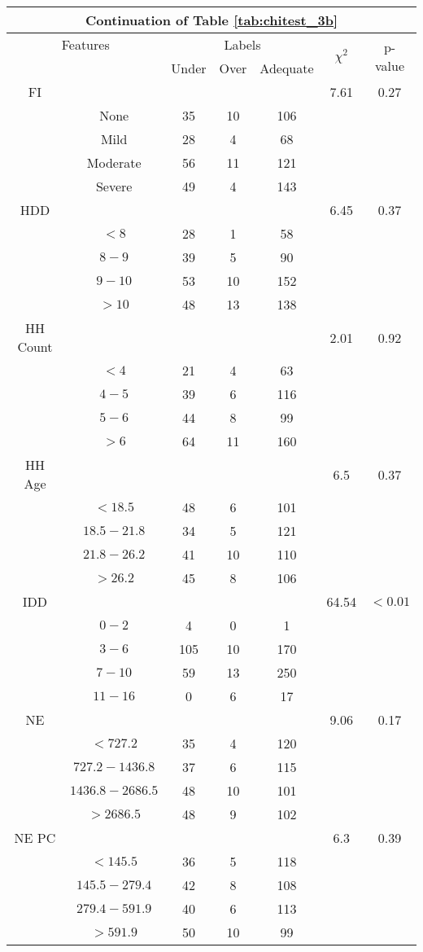 \begin{table}
\centering
\label{tab:chitest_3b_cont}
\begin{tabular}{c c | c c c| c | c}
\hline
\multicolumn{7}{c}{Continuation of Table \ref{tab:chitest_3b}}\\ 
\hline
\multicolumn{2}{c|}{Features}& \multicolumn{3}{c|}{Labels}& \multirow{2}{*}{$\chi^2$} & \multirow{2}{*}{p-value}\\ 
& & Under & Over & Adequate & & \\ 
\hline
FI &  &  &  & & 7.61 & 0.27 \\ 
& None & 35 & 10 & 106& & \\ 
& Mild & 28 & 4 & 68& & \\ 
& Moderate & 56 & 11 & 121& & \\ 
& Severe & 49 & 4 & 143& & \\ 
\hline 
HDD &  &  &  & & 6.45 & 0.37 \\ 
& $< 8$ & 28 & 1 & 58& & \\ 
& $8-9$ & 39 & 5 & 90& & \\ 
& $9-10$ & 53 & 10 & 152& & \\ 
& $> 10$ & 48 & 13 & 138& & \\ 
\hline 
HH Count &  &  &  & & 2.01 & 0.92 \\ 
& $< 4$ & 21 & 4 & 63& & \\ 
& $4-5$ & 39 & 6 & 116& & \\ 
& $5-6$ & 44 & 8 & 99& & \\ 
& $> 6$ & 64 & 11 & 160& & \\ 
\hline 
HH Age &  &  &  & & 6.5 & 0.37 \\ 
& $< 18.5$ & 48 & 6 & 101& & \\ 
& $18.5-21.8$ & 34 & 5 & 121& & \\ 
& $21.8-26.2$ & 41 & 10 & 110& & \\ 
& $> 26.2$ & 45 & 8 & 106& & \\ 
\hline 
IDD &  &  &  & & 64.54 & $< 0.01$ \\ 
& $0-2$ & 4 & 0 & 1& & \\ 
& $3-6$ & 105 & 10 & 170& & \\ 
& $7-10$ & 59 & 13 & 250& & \\ 
& $11-16$ & 0 & 6 & 17& & \\ 
\hline 
NE &  &  &  & & 9.06 & 0.17 \\ 
& $< 727.2$ & 35 & 4 & 120& & \\ 
& $727.2-1436.8$ & 37 & 6 & 115& & \\ 
& $1436.8-2686.5$ & 48 & 10 & 101& & \\ 
& $> 2686.5$ & 48 & 9 & 102& & \\ 
\hline 
NE PC &  &  &  & & 6.3 & 0.39 \\ 
& $< 145.5$ & 36 & 5 & 118& & \\ 
& $145.5-279.4$ & 42 & 8 & 108& & \\ 
& $279.4-591.9$ & 40 & 6 & 113& & \\ 
& $> 591.9$ & 50 & 10 & 99& & \\ 
\hline 
\end{tabular}
\end{table}

